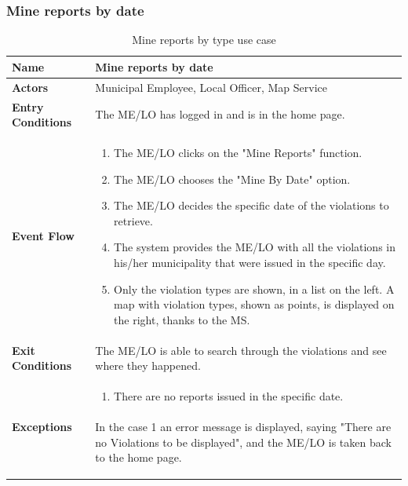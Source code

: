 					\subsubsection{Mine reports by date}
					\begin{table}[!h]
						\centering
						\vspace{-2mm}
						\begin{tabular}{lp{}}
							\toprule
							\textbf{Name} & \textbf{Mine reports by date} \\[1mm]
							\midrule
							\textbf{Actors} & Municipal Employee, Local Officer, Map Service \\[1mm]
							\textbf{Entry Conditions} & The ME/LO has logged in and is in the home page. \vspace{1mm}\\
							\textbf{Event Flow} &
							\vspace{-5mm} 
							\begin{enumerate}
								\setlength\itemsep{0.2mm}
								\item The ME/LO clicks on the "Mine Reports" function.
								\item The ME/LO chooses the "Mine By Date" option.
								\item The ME/LO decides the specific date of the violations to retrieve.
								\item The system provides the ME/LO with all the violations in his/her municipality that were issued in the specific day.
								\item Only the violation types are shown, in a list on the left. A map with violation types, shown as points, is displayed on the right, thanks to the MS.
							\end{enumerate} \\
							\textbf{Exit Conditions} & The ME/LO is able to search through the violations and see where they happened. \vspace{1mm}\\
							\textbf{Exceptions} & 
								\vspace{-5mm} 
								\begin{enumerate}
									\item There are no reports issued in the specific date.
								\end{enumerate}
								\vspace{-7mm}
								\paragraph{}
									In the case 1 an error message is displayed, saying "There are no Violations to be displayed", and the ME/LO is taken back to the home page. \\
							\bottomrule
						\end{tabular}
						\caption{Mine reports by type use case}
					\end{table}
					\clearpage
